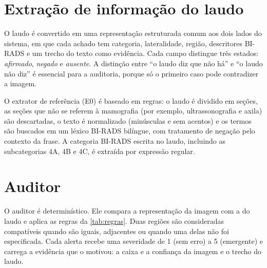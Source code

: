 
\section{Extração de informação do laudo}

O laudo é convertido em uma representação estruturada comum aos dois lados do sistema, em que cada achado tem categoria, lateralidade, região, descritores BI-RADS e um trecho do texto como evidência. Cada campo distingue três estados: \textit{afirmado}, \textit{negado} e \textit{ausente}. A distinção entre ``o laudo diz que não há'' e ``o laudo não diz'' é essencial para a auditoria, porque só o primeiro caso pode contradizer a imagem.

O extrator de referência (E0) é baseado em regras: o laudo é dividido em seções, as seções que não se referem à mamografia (por exemplo, ultrassonografia e axila) são descartadas, o texto é normalizado (minúsculas e sem acentos) e os termos são buscados em um léxico BI-RADS bilíngue, com tratamento de negação pelo contexto da frase. A categoria BI-RADS escrita no laudo, incluindo as subcategorias 4A, 4B e 4C, é extraída por expressão regular.


\section{Auditor}

O auditor é determinístico. Ele compara a representação da imagem com a do laudo e aplica as regras da \autoref{tab:regras}. Duas regiões são consideradas compatíveis quando são iguais, adjacentes ou quando uma delas não foi especificada. Cada alerta recebe uma severidade de 1 (sem erro) a 5 (emergente)  e carrega a evidência que o motivou: a caixa e a confiança da imagem e o trecho do laudo.

